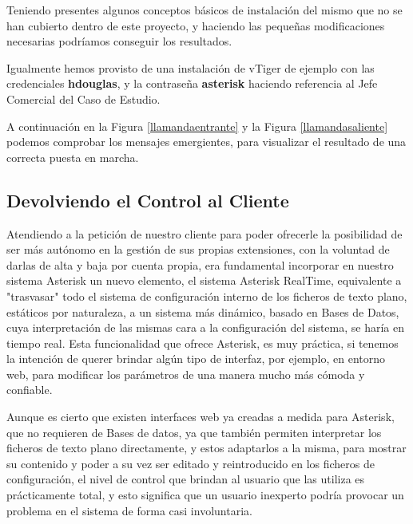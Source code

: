 Teniendo presentes algunos conceptos básicos de instalación del mismo que no se han cubierto dentro de este proyecto, y haciendo las pequeñas modificaciones necesarias podríamos conseguir los resultados.

Igualmente hemos provisto de una instalación de vTiger de ejemplo con las credenciales \textbf{hdouglas}, y la contraseña \textbf{asterisk} haciendo referencia al Jefe Comercial del Caso de Estudio.

A continuación en la Figura \ref{llamandaentrante} y la Figura \ref{llamandasaliente} podemos comprobar los mensajes emergientes, para visualizar el resultado de una correcta puesta en marcha.



\newpage

\subsection{Devolviendo el Control al Cliente}

Atendiendo a la petición de nuestro cliente para poder ofrecerle la posibilidad de ser más autónomo en la gestión de sus propias extensiones, con la voluntad de darlas de alta y baja por cuenta propia, era fundamental incorporar en nuestro sistema Asterisk un nuevo elemento, el sistema Asterisk RealTime, equivalente a "trasvasar" todo el sistema de configuración interno de los ficheros de texto plano, estáticos por naturaleza, a un sistema más dinámico, basado en Bases de Datos, cuya interpretación de las mismas cara a la configuración del sistema, se haría en tiempo real. Esta funcionalidad que ofrece Asterisk, es muy práctica, si tenemos la intención de querer brindar algún tipo de interfaz, por ejemplo, en entorno web, para modificar los parámetros de una manera mucho más cómoda y confiable.

Aunque es cierto que existen interfaces web ya creadas a medida para Asterisk, que no requieren de Bases de datos, ya que también permiten interpretar los ficheros de texto plano directamente, y estos adaptarlos a la misma, para mostrar su contenido y poder a su vez ser editado y reintroducido en los ficheros de configuración, el nivel de control que brindan al usuario que las utiliza es prácticamente total, y esto significa que un usuario inexperto podría provocar un problema en el sistema de forma casi involuntaria. 

